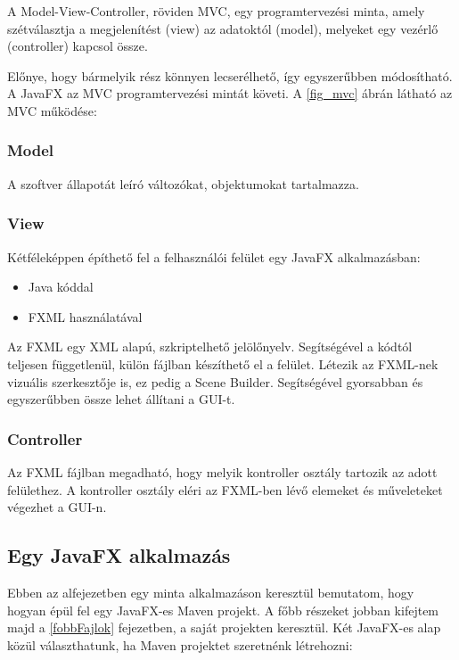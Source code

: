 A Model-View-Controller, röviden MVC, egy programtervezési minta, amely szétválasztja a megjelenítést (view) az adatoktól (model), melyeket egy vezérlő (controller) kapcsol össze. 

Előnye, hogy bármelyik rész könnyen lecserélhető, így egyszerűbben módosítható.
A JavaFX az MVC programtervezési mintát követi.
A \ref{fig_mvc} ábrán látható az MVC működése:



\subsubsection*{Model} 

A szoftver állapotát leíró változókat, objektumokat tartalmazza. 

\subsubsection*{View}

Kétféleképpen építhető fel a felhasználói felület egy JavaFX alkalmazásban: 

\begin{itemize}
\item Java kóddal 
\item FXML használatával 
\end{itemize}

Az FXML egy XML alapú, szkriptelhető jelölőnyelv.
Segítségével a kódtól teljesen függetlenül, külön fájlban készíthető el a felület.
Létezik az FXML-nek vizuális szerkesztője is, ez pedig a Scene Builder.
Segítségével gyorsabban és egyszerűbben össze lehet állítani a GUI-t. \cite{javafx}

\subsubsection*{Controller}

Az FXML fájlban megadható, hogy melyik kontroller osztály tartozik az adott felülethez.
A kontroller osztály eléri az FXML-ben lévő elemeket és műveleteket végezhet a GUI-n.


\subsection{Egy JavaFX alkalmazás}\label{javafxMinta}

Ebben az alfejezetben egy minta alkalmazáson keresztül bemutatom, hogy hogyan épül fel egy JavaFX-es Maven projekt.
A főbb részeket jobban kifejtem majd a \ref{fobbFajlok} fejezetben, a saját projekten keresztül.
Két JavaFX-es alap közül választhatunk, ha Maven projektet szeretnénk létrehozni: 

